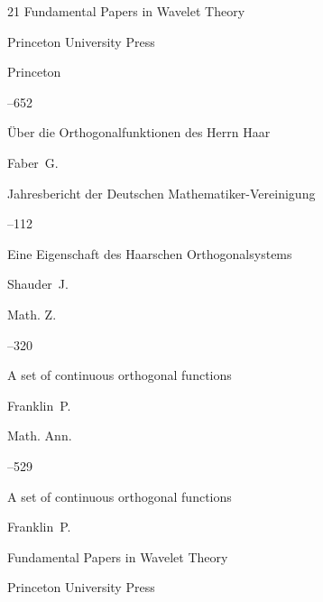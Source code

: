 \begin{thebibliography}{21}
\inbook Fundamental Papers in Wavelet Theory

\publ Princeton University Press

\publaddr Princeton 


–652








\paper \"Uber die Orthogonalfunktionen des Herrn Haar

\by Faber~G.

\jour Jahresbericht der Deutschen Mathematiker-Vereinigung



--112






\paper Eine Eigenschaft des Haarschen Orthogonalsystems 

\by Shauder~J.

\jour Math. Z. 




--320





\paper A set of continuous orthogonal functions 

\by Franklin~P.

\jour Math. Ann. 




--529


\moreref

\paper A set of continuous orthogonal functions 

\by Franklin~P.

\inbook Fundamental Papers in Wavelet Theory

\publ Princeton University Press


\end{thebibliography}
